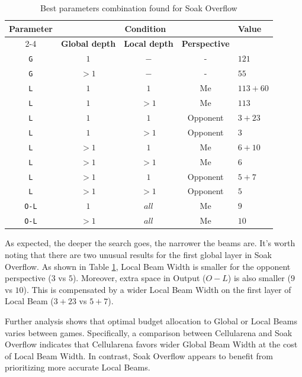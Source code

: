 \documentclass[shortabstract, mgr, english]{iithesis}
\begin{document}
\begin{table}[h]
\centering
\begin{tabular}{|c|c|c|c|l|}
\hline
\multirow{2}{*}{\textbf{Parameter}} & \multicolumn{3}{c|}{\textbf{Condition}} & \multirow{2}{*}{\textbf{Value}} \\
\cline{2-4}
& \textbf{Global depth} & \textbf{Local depth} & \textbf{Perspective} & \\
\hline
\texttt{G}   & $1$  & $-$   & -  & $121$ \\
\texttt{G}   & $>1$ & $-$   & -  & $55$  \\

\texttt{L} & $1$ & $1$  & Me       & $113+60$ \\
\texttt{L} & $1$ & $>1$ & Me       & $113$    \\
\texttt{L} & $1$ & $1$  & Opponent & $3+23$   \\
\texttt{L} & $1$ & $>1$ & Opponent & $3$     \\

\texttt{L} & $>1$ & $1$  & Me       & $6+10$ \\
\texttt{L} & $>1$ & $>1$ & Me       & $6$   \\
\texttt{L} & $>1$ & $1$  & Opponent & $5+7$ \\
\texttt{L} & $>1$ & $>1$ & Opponent & $5$   \\

\texttt{O-L} & $1$  & $all$ & Me & $9$   \\
\texttt{O-L} & $>1$ & $all$ & Me & $10$  \\
\hline
\end{tabular}
\caption{Best parameters combination found for Soak Overflow}
\label{tab:SoakOverflowParamComb}
\end{table}

\clearpage

As expected, the deeper the search goes, the narrower the beams are. It's worth noting that there are two unusual results for the first global layer in Soak Overflow. As shown in Table \ref{tab:SoakOverflowParamComb}, Local Beam Width is smaller for the opponent perspective ($3$ vs $5$). Moreover, extra space in Output ($O-L$) is also smaller ($9$ vs $10$). This is compensated by a wider Local Beam Width on the first layer of Local Beam ($3+23$ vs $5+7$). 

Further analysis shows that optimal budget allocation to Global or Local Beams varies between games. Specifically, a comparison between Cellularena and Soak Overflow indicates that Cellularena favors wider Global Beam Width at the cost of Local Beam Width. In contrast, Soak Overflow appears to benefit from prioritizing more accurate Local Beams.
\end{document}
